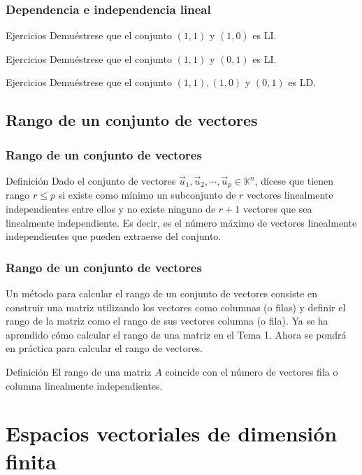 \documentclass{beamer}
\begin{document}
\begin{frame}
  \frametitle{Dependencia e independencia lineal}
  \begin{block}{Ejercicios}
Demu\'estrese que el conjunto $(1,1)$ y $(1,0)$ es LI.
\end{block}
  \begin{block}{Ejercicios}
Demu\'estrese que el conjunto $(1,1)$ y $(0,1)$ es LI.
\end{block}
  \begin{block}{Ejercicios}
Demu\'estrese que el conjunto $(1,1),(1,0)$ y $(0,1)$ es LD.
\end{block}
\end{frame}


\subsection{Rango de un conjunto de vectores}
\begin{frame}
  \frametitle{Rango de un conjunto de vectores}
  \begin{block}{Definici\'on}
Dado el conjunto de vectores $\vec u_1,\vec u_2,\cdots,\vec u_p\in\mathbb K^n$, d\'icese que tienen rango $r\leq p$ si existe como m\'inimo un subconjunto de $r$ vectores linealmente independientes entre ellos y no existe ninguno de $r+1$ vectores que sea linealmente independiente. Es decir, es el n\'umero m\'aximo de vectores linealmente independientes que pueden extraerse del conjunto.
\end{block}
  \end{frame}



\begin{frame}
  \frametitle{Rango de un conjunto de vectores}
  Un m\'etodo para calcular el rango de un conjunto de vectores consiste en construir una matriz utilizando los vectores como columnas (o filas) y definir el rango de la matriz como el rango de sus vectores columna (o fila). Ya se ha aprendido c\'omo calcular el rango de una matriz en el Tema 1. Ahora se pondr\'a en pr\'actica para calcular el rango de vectores.
  \begin{block}{Definici\'on}
El rango de una matriz $A$ coincide con el n\'umero de vectores fila o columna linealmente independientes. 
\end{block}
    \end{frame}


\section{Espacios vectoriales de dimensi\'on finita}
\end{document}
